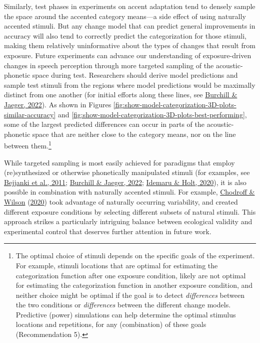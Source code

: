 \documentclass[
  11pt,
  english,
  man,floatsintext]{apa6}
\begin{document}
Similarly, test phases in experiments on accent adaptation tend to densely sample the space around the accented category means---a side effect of using naturally accented stimuli. But any change model that can predict general improvements in accuracy will also tend to correctly predict the categorization for those stimuli, making them relatively uninformative about the types of changes that result from exposure. Future experiments can advance our understanding of exposure-driven changes in speech perception through more targeted sampling of the acoustic-phonetic space during test. Researchers should derive model predictions and sample test stimuli from the regions where model predictions would be maximally distinct from one another (for initial efforts along these lines, see \protect\hyperlink{ref-burchill-jaeger2022}{Burchill \& Jaeger, 2022}). As shown in Figures \ref{fig:show-model-categorization-3D-plots-similar-accuracy} and \ref{fig:show-model-categorization-3D-plots-best-performing}, some of the largest predicted differences can occur in parts of the acoustic-phonetic space that are neither close to the category means, nor on the line between them.\footnote{The optimal choice of stimuli depends on the specific goals of the experiment. For example, stimuli locations that are optimal for estimating the categorization function after one exposure condition, likely are not optimal for estimating the categorization function in another exposure condition, and neither choice might be optimal if the goal is to detect \emph{differences} between the two conditions or \emph{differences} between the different change models. Predictive (power) simulations can help determine the optimal stimulus locations and repetitions, for any (combination) of these goals (Recommendation 5).}

While targeted sampling is most easily achieved for paradigms that employ (re)synthesized or otherwise phonetically manipulated stimuli (for examples, see \protect\hyperlink{ref-bejjanki2011}{Bejjanki et al., 2011}; \protect\hyperlink{ref-burchill-jaeger2022}{Burchill \& Jaeger, 2022}; \protect\hyperlink{ref-idemaru-holt2020}{Idemaru \& Holt, 2020}), it is also possible in combination with naturally accented stimuli. For example, \protect\hyperlink{ref-chodroff-wilson2020}{Chodroff \& Wilson} (\protect\hyperlink{ref-chodroff-wilson2020}{2020}) took advantage of naturally occurring variability, and created different exposure conditions by selecting different subsets of natural stimuli. This approach strikes a particularly intriguing balance between ecological validity and experimental control that deserves further attention in future work.
\end{document}
